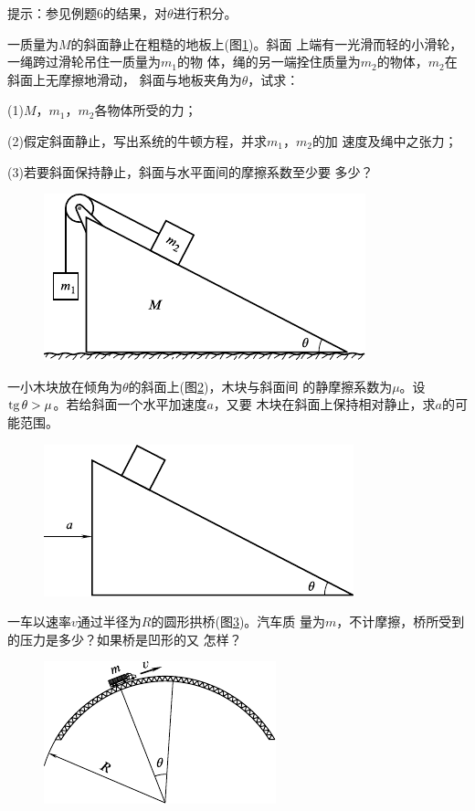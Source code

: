 \begin{exercises}
\lbr 提示：参见例题6的结果，对$ \theta $进行积分。\rbr

\exercise 一质量为$ M $的斜面静止在粗糙的地板上(图\ref{fig:03.41})。斜面
上端有一光滑而轻的小滑轮，一绳跨过滑轮吊住一质量为$ m_1 $的物
体，绳的另一端拴住质量为$ m_2 $的物体，$ m _ { 2 } $在斜面上无摩擦地滑动，
斜面与地板夹角为$ \theta $，试求：

(1)\;$ M $，$ m _ { 1 } $，$ m _ { 2 } $各物体所受的力；

(2)假定斜面静止，写出系统的牛顿方程，并求$ m_1 $，$ m_2 $的加
速度及绳中之张力；

(3)若要斜面保持静止，斜面与水平面间的摩擦系数至少要
多少？

\begin{figure}[h]
  \centering
  \includegraphics{figure/fig03.41}
  \caption{}
  \label{fig:03.41}
  \vspace{-0.5em}
\end{figure}

\exercise 一小木块放在倾角为$ \theta $的斜面上(图\ref{fig:03.42})，木块与斜面间
的静摩擦系数为$ \mu $。设$ \operatorname{tg} \theta > \mu $。若给斜面一个水平加速度$ a $，又要
木块在斜面上保持相对静止，求$ a $的可能范围。
\begin{figure}[h]
  \centering
  \includegraphics{figure/fig03.42}
  \caption{}
  \label{fig:03.42}
  \vspace{-0.5em}
\end{figure}

\exercise 一车以速率$ v $通过半径为$ R $的圆形拱桥(图\ref{fig:03.43})。汽车质
量为$ m $，不计摩擦，桥所受到的压力是多少？如果桥是凹形的又
怎样？
\begin{figure}[h]
  \centering
  \includegraphics{figure/fig03.43}
  \caption{}
  \label{fig:03.43}
\end{figure}
\end{exercises}

